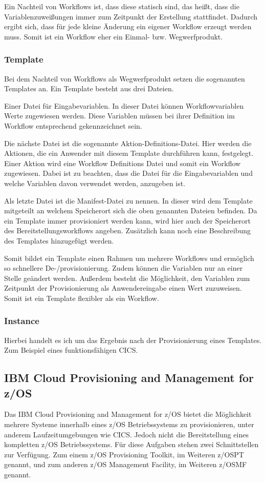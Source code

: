 Ein Nachteil von Workflows ist, dass diese statisch sind, das heißt, dass die Variablenzuweißungen immer zum Zeitpunkt der Erstellung stattfindet.
Dadurch ergibt sich, dass für jede kleine Änderung ein eigener Workflow erzeugt werden muss.
Somit ist ein Workflow eher ein Einmal- bzw. Wegwerfprodukt.

\subsubsection{Template}
Bei dem Nachteil von Workflows als Wegwerfprodukt setzen die sogenannten Templates an.
Ein Template besteht aus drei Dateien.

Einer Datei für Eingabevariablen.
In dieser Datei können Workflowvariablen Werte zugewiesen werden.
Diese Variablen müssen bei ihrer Definition im Workflow entsprechend gekennzeichnet sein.

Die nächste Datei ist die sogenannte Aktion-Definitions-Datei.
Hier werden die Aktionen, die ein Anwender mit diesem Template durchführen kann, festgelegt.
Einer Aktion wird eine Workflow Definitions Datei und somit ein Workflow zugewiesen.
Dabei ist zu beachten, dass die Datei für die Eingabevariablen und welche Variablen davon verwendet werden, anzugeben ist.

Als letzte Datei ist die Manifest-Datei zu nennen.
In dieser wird dem Template mitgeteilt an welchem Speicherort sich die oben genannten Dateien befinden.
Da ein Template immer provisioniert werden kann, wird hier auch der Speicherort des Bereitstellungsworkflows angeben.
Zusätzlich kann noch eine Beschreibung des Templates hinzugefügt werden.

Somit bildet ein Template einen Rahmen um mehrere Workflows und ermöglich so schnellere De-/provisionierung.
Zudem können die Variablen nur an einer Stelle geändert werden.
Außerdem besteht die Möglichkeit, den Variablen zum Zeitpunkt der Provisionierung als Anwendereingabe einen Wert zuzuweisen.
Somit ist ein Template flexibler als ein Workflow.
\cite{IBM.2019}

\subsubsection{Instance}
Hierbei handelt es ich um das Ergebnis nach der Provisionierung eines Templates.
Zum Beispiel eines funktionsfähigen CICS.

\subsection{IBM Cloud Provisioning and Management for z/OS}
Das IBM Cloud Provisioning and Management for z/OS bietet die Möglichkeit mehrere Systeme innerhalb eines z/OS Betriebssystems zu provisionieren, unter anderem Laufzeitumgebungen wie CICS.
Jedoch nicht die Bereitstellung eines kompletten z/OS Betriebssystems.
Für diese Aufgaben stehen zwei Schnittstellen zur Verfügung.
Zum einem z/OS Provisioning Toolkit, im Weiteren z/OSPT genannt, und zum anderen z/OS Management Facility, im Weiteren z/OSMF genannt.
\cite{KeithWinnardGaryPuchkoffHirenShah.2016}

